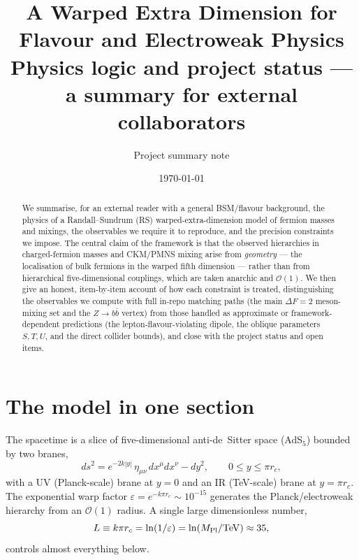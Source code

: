 \documentclass[11pt]{article}
\title{\bf A Warped Extra Dimension for Flavour and Electroweak Physics\\[3pt]
\large Physics logic and project status --- a summary for external collaborators}
\author{Project summary note}
\date{\today}
\newcommand{\eps}{\varepsilon}
\begin{document}
\maketitle

\begin{abstract}
\noindent
We summarise, for an external reader with a general BSM/flavour background, the
physics of a Randall--Sundrum (RS) warped-extra-dimension model of fermion masses
and mixings, the observables we require it to reproduce, and the precision
constraints we impose. The central claim of the framework is that the observed
hierarchies in charged-fermion masses and CKM/PMNS mixing arise from
\emph{geometry} --- the localisation of bulk fermions in the warped fifth
dimension --- rather than from hierarchical five-dimensional couplings, which are
taken anarchic and $\mathcal{O}(1)$. We then give an honest, item-by-item account
of how each constraint is treated, distinguishing the observables we compute
with full in-repo matching paths (the main $\Delta F=2$ meson-mixing set and the
$Z\to b\bar b$ vertex) from those handled as approximate or framework-dependent
predictions (the lepton-flavour-violating dipole, the oblique parameters $S,T,U$,
and the direct collider bounds), and close with the project status and open items.
\end{abstract}

\section{The model in one section}

The spacetime is a slice of five-dimensional anti-de~Sitter space (AdS$_5$)
bounded by two branes,
\begin{equation}
ds^2 = e^{-2k|y|}\,\eta_{\mu\nu}\,dx^\mu dx^\nu - dy^2,
\qquad 0 \le y \le \pi r_c,
\end{equation}
with a UV (Planck-scale) brane at $y=0$ and an IR (TeV-scale) brane at
$y=\pi r_c$. The exponential warp factor $\eps = e^{-k\pi r_c}\sim 10^{-15}$
generates the Planck/electroweak hierarchy from an $\mathcal{O}(1)$ radius. A
single large dimensionless number,
\begin{equation}
L \equiv k\pi r_c = \ln(1/\eps) = \ln(M_{\rm Pl}/\mathrm{TeV}) \approx 35,
\end{equation}
controls almost everything below.
\end{document}

